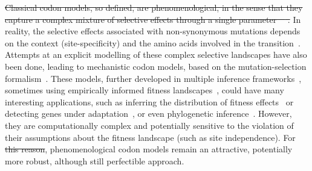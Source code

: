 \documentclass{article}
\providecommand{\DIFaddtex}[1]{{\protect\color{blue}\uwave{#1}}} %
\providecommand{\DIFdeltex}[1]{{\protect\color{red}\sout{#1}}}                      %
\providecommand{\DIFaddbegin}{} %
\providecommand{\DIFaddend}{} %
\providecommand{\DIFdelbegin}{} %
\providecommand{\DIFdelend}{} %
\providecommand{\DIFadd}[1]{\texorpdfstring{\DIFaddtex{#1}}{#1}} %
\providecommand{\DIFdel}[1]{\texorpdfstring{\DIFdeltex{#1}}{}} %
\begin{document}
\DIFdelbegin \DIFdel{Classical codon models, so defined, are phenomenological, in the sense that they capture a complex mixture of selective effects through a single parameter~\mbox{%
\citep{Rodrigue2010a}}\hspace{0pt}%
.
}\DIFdelend %
In reality, the selective effects associated with {non-synonymous} mutations depends on the context (site-specificity) and the amino acids involved in the transition~\citep{Kosiol2007}.
Attempts at an explicit modelling of these complex selective landscapes have also been done, leading to mechanistic codon models, based on the mutation-selection formalism~\citep{Halpern1998}.
These models, further developed in multiple inference frameworks~\citep{Rodrigue2010, Tamuri2012}, sometimes using empirically informed fitness landscapes~\citep{Bloom2014}, could have many interesting applications, such as inferring the distribution of fitness effects~\citep{Tamuri2012} or detecting genes under adaptation~\citep{Rodrigue2016, Rodrigue2021}, or even phylogenetic inference~\citep{Ren2005}.
However, they are computationally complex and potentially sensitive to the violation of their assumptions about the fitness landscape (such as site independence).
For \DIFdelbegin \DIFdel{this reason}\DIFdelend \DIFaddbegin \DIFadd{these reasons}\DIFaddend , phenomenological codon models remain an attractive, potentially more robust, although still perfectible approach.
\end{document}
